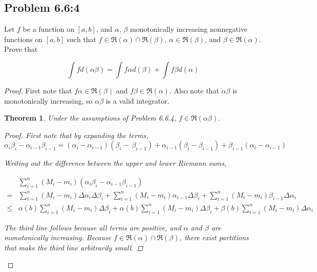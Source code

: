 \documentclass{amsart}
\newcommand{\RiemannIntable}{
  \mathfrak{R}
}
\newtheorem{theorem}{Theorem}
\begin{document}
\subsection*{Problem 6.6:4}

Let $f$ be a function on $[a, b]$, and $\alpha$, $\beta$ monotonically increasing nonnegative functions on $[a, b]$ such that $f \in \RiemannIntable(\alpha) \cap \RiemannIntable(\beta)$, $\alpha \in \RiemannIntable(\beta)$, and $\beta \in \RiemannIntable(\alpha)$. Prove that

\[
\int f d(\alpha \beta) = \int f \alpha d(\beta) + \int f \beta d(\alpha)
\]

\begin{proof}

First note that $f\alpha \in \RiemannIntable(\beta)$ and $f\beta \in \RiemannIntable(\alpha)$. Also note that $\alpha\beta$ is monotonically increasing, so $\alpha\beta$ is a valid integrator.

\begin{theorem}
Under the assumptions of Problem 6.6.4, $f \in \RiemannIntable(\alpha\beta)$.
\begin{proof}

First note that by expanding the terms,
\[
\alpha_i\beta_i - \alpha_{i-1}\beta_{i-1} = (\alpha_i - \alpha_{i-1})(\beta_i - \ \beta_{i-1})
+ \alpha_{i-1}(\beta_i - \beta_{i-1}) + \beta_{i-1}(\alpha_i - \alpha_{i-1})
\]

Writing out the difference between the upper and lower Riemann sums,

\begin{align*}
& \sum_{i=1}^n (M_i - m_i)(\alpha_i\beta_i - \alpha_{i-1}\beta_{i-1}) \\
= & \sum_{i=1}^n (M_i - m_i)\Delta\alpha_i \Delta\beta_i
+ \sum_{i=1}^n (M_i - m_i)\alpha_{i-1} \Delta\beta_i
+ \sum_{i=1}^n (M_i - m_i)\beta_{i-1} \Delta\alpha_i \\
\leq 
& \alpha(b)\sum_{i=1}^n (M_i - m_i) \Delta\beta_i
+ \alpha(b)\sum_{i=1}^n (M_i - m_i) \Delta\beta_i
+ \beta(b)\sum_{i=1}^n (M_i - m_i) \Delta\alpha_i
\end{align*}

The third line follows because all terms are positive, and $\alpha$ and $\beta$ are monotonically increasing. Because $f \in \RiemannIntable(\alpha)\cap \RiemannIntable(\beta)$, there exist partitions that make the third line arbitrarily small.

\end{proof}
\end{theorem}


\end{proof}
\end{document}
